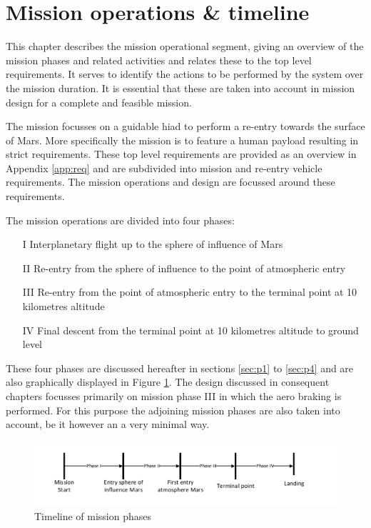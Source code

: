 \section{Mission operations \& timeline}\label{cha:opseg}
This chapter describes the mission operational segment, giving an overview of the mission phases and related activities and relates these to the top level requirements. It serves to identify the actions to be performed by the system over the mission duration. It is essential that these are taken into account in mission design for a complete and feasible mission. 

The mission focusses on a guidable \acrfull{hiad} to perform a re-entry towards the surface of Mars. More specifically the mission is to feature a human payload resulting in strict requirements. These top level requirements are provided as an overview in Appendix \ref{app:req} and are subdivided into mission and re-entry vehicle requirements. The mission operations and design are focussed around these requirements.

The mission operations are divided into four phases: 

\begin{itemize}
\item[I]{Interplanetary flight up to the sphere of influence of Mars}
\item[II]{Re-entry from the sphere of influence to the point of atmospheric entry}
\item[III]{Re-entry from the point of atmospheric entry to the terminal point at 10 kilometres altitude}
\item[IV]{Final descent from the terminal point at 10 kilometres altitude to ground level}
\end{itemize}

These four phases are discussed hereafter in sections \ref{sec:p1} to \ref{sec:p4} and are also graphically displayed in Figure  \ref{fig:time}. The design discussed in consequent chapters focusses primarily on mission phase III in which the aero braking is performed. For this purpose the adjoining mission phases are also taken into account, be it however an a very minimal way. 

\begin{figure}[H]
\centering
\includegraphics[width = 1.0\textwidth]{Figure/OPS.pdf}
\caption{Timeline of mission phases}
\label{fig:time}
\end{figure}


